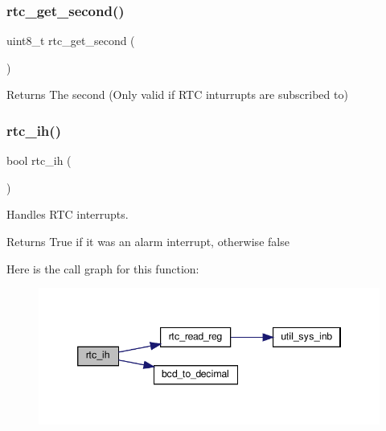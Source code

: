 \subsubsection{\texorpdfstring{rtc\+\_\+get\+\_\+second()}{rtc\_get\_second()}}
{\footnotesize\ttfamily uint8\+\_\+t rtc\+\_\+get\+\_\+second (\begin{DoxyParamCaption}{ }\end{DoxyParamCaption})}

\begin{DoxyReturn}{Returns}
The second (Only valid if R\+TC inturrupts are subscribed to) 
\end{DoxyReturn}
\mbox{\label{group__rtc_ga55d98e39c0c2bf246ef774491c31b593}} 
\subsubsection{\texorpdfstring{rtc\+\_\+ih()}{rtc\_ih()}}
{\footnotesize\ttfamily bool rtc\+\_\+ih (\begin{DoxyParamCaption}{ }\end{DoxyParamCaption})}



Handles R\+TC interrupts. 

\begin{DoxyReturn}{Returns}
True if it was an alarm interrupt, otherwise false 
\end{DoxyReturn}
Here is the call graph for this function\+:\nopagebreak
\begin{figure}[H]
\begin{center}
\leavevmode
\includegraphics[width=346pt]{group__rtc_ga55d98e39c0c2bf246ef774491c31b593_cgraph}
\end{center}
\end{figure}
\mbox{\label{group__rtc_gaacd5a961df48ee02b0d95588cbe00be5}} 
